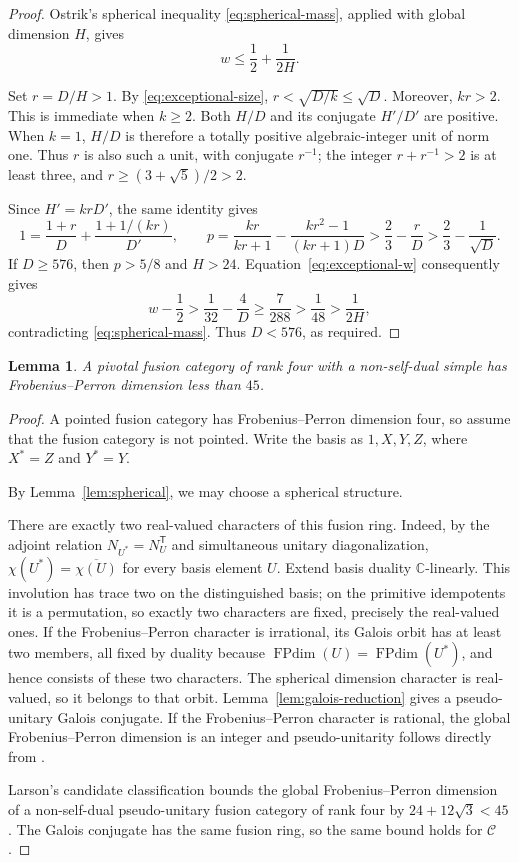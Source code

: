 \documentclass[11pt]{amsart}
\newtheorem{lemma}[theorem]{Lemma}
\theoremstyle{definition}
\DeclareMathOperator{\FPdim}{FPdim}
\newcommand{\C}{\mathbb C}
\numberwithin{equation}{section}
\begin{document}
\begin{proof}
Ostrik's spherical inequality \eqref{eq:spherical-mass},
applied with global dimension $H$, gives
\[
 w\leq\frac12+\frac1{2H}.
\]

Set $r=D/H>1$. By \eqref{eq:exceptional-size}, $r<\sqrt{D/k}\leq\sqrt D$. Moreover, $kr>2$. This is immediate when $k\geq2$. Both $H/D$ and its conjugate $H'/D'$ are positive. When $k=1$,
$H/D$ is therefore a totally positive algebraic-integer unit of norm one. Thus $r$ is also such a unit, with conjugate $r^{-1}$; the integer $r+r^{-1}>2$ is at least three, and $r\geq(3+\sqrt5)/2>2$.

Since $H'=krD'$, the same identity gives
\[
 1=\frac{1+r}{D}+\frac{1+1/(kr)}{D'},\qquad
 p=\frac{kr}{kr+1}-\frac{kr^2-1}{(kr+1)D}
 >\frac23-\frac rD>\frac23-\frac1{\sqrt D}.
\]
If $D\geq576$, then $p>5/8$ and $H>24$. Equation~\eqref{eq:exceptional-w} consequently gives
\[
 w-\frac12>\frac1{32}-\frac4D
 \geq\frac7{288}>\frac1{48}>\frac1{2H},
\]
contradicting \eqref{eq:spherical-mass}. Thus $D<576$, as required.
\end{proof}

\begin{lemma}\label{lem:nonselfdual}
A pivotal fusion category of rank four with a non-self-dual simple has Frobenius--Perron dimension less than $45$.
\end{lemma}
\begin{proof}
A pointed fusion category has Frobenius--Perron dimension four, so assume
that the fusion category is not pointed. Write the basis as $1,X,Y,Z$, where $X^*=Z$ and $Y^*=Y$.

By Lemma~\ref{lem:spherical}, we may choose a spherical structure.

There are exactly two real-valued characters of this fusion ring. Indeed, by the adjoint relation $N_{U^*}=N_U^{\mathsf T}$ and simultaneous unitary diagonalization, $\chi(U^*)=\overline{\chi(U)}$ for every basis element $U$. Extend basis duality $\C$-linearly. This involution has trace two on the distinguished basis; on the primitive idempotents it is a permutation, so exactly two characters are fixed, precisely the real-valued ones. If the Frobenius--Perron character is irrational, its Galois orbit has at least two members, all fixed by duality because
$\FPdim(U)=\FPdim(U^*)$, and hence consists of these two characters. The spherical dimension character is real-valued, so it belongs to that orbit. Lemma~\ref{lem:galois-reduction} gives a pseudo-unitary Galois conjugate. If the Frobenius--Perron character is rational, the global Frobenius--Perron dimension is an integer and pseudo-unitarity follows directly from \cite[Proposition~8.24]{ENO}.

Larson's candidate classification \cite[Theorem~1.1]{Larson} bounds
the global Frobenius--Perron dimension of a non-self-dual pseudo-unitary
fusion category of rank four by $24+12\sqrt3<45$.
The Galois conjugate has the same fusion ring, so the same bound holds
for $\mathcal C$.
\end{proof}
\end{document}
